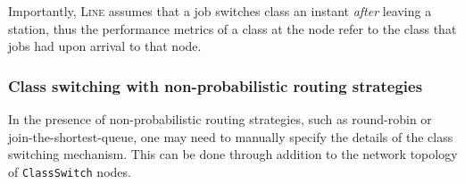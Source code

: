 
Importantly, \textsc{Line} assumes that a job switches class an instant {\em after} leaving a station, thus the performance metrics of a class at the node refer to the class that jobs had upon arrival to that node.

\subsubsection{Class switching with non-probabilistic routing strategies}
In the presence of non-probabilistic routing strategies, such as round-robin or join-the-shortest-queue, one may need to manually specify the details of the class switching mechanism. This can be done through addition to the network topology of \texttt{ClassSwitch} nodes. 

